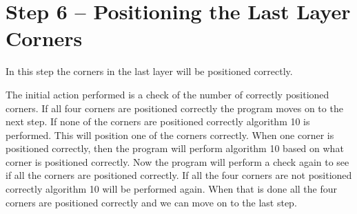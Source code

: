 \section{Step 6 -- Positioning the Last Layer Corners}
In this step the corners in the last layer will be positioned correctly. 

The initial action performed is a check of the number of correctly positioned corners. 
If all four corners are positioned correctly the program moves on to the next step.
If none of the corners are positioned correctly algorithm 10 is performed. This will position one of the corners correctly.
When one corner is positioned correctly, then the program will perform algorithm 10 based on what corner is positioned correctly.
Now the program will perform a check again to see if all the corners are positioned correctly. If all the four corners are not positioned correctly algorithm 10 will be performed again.
When that is done all the four corners are positioned correctly and we can move on to the last step.
